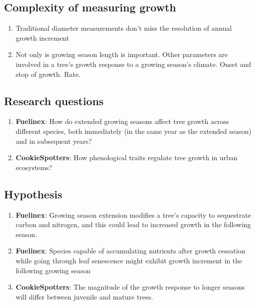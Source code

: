 \documentclass{article}
\begin{document}
\subsection{Complexity of measuring growth}
\begin{enumerate}
	\item Traditional diameter measurements don't miss the resolution of annual growth increment
	\item Not only is growing season length is important. Other parameters are involved in a tree's growth response to a growing season's climate. Onset and stop of growth. Rate. 
\end{enumerate}

\subsection {Research questions} %
\begin {enumerate}
	\item \textbf{Fuelinex}: How do extended growing seasons affect tree growth across different species, both immediately (in the same year as the extended season) and in subsequent years?
	\item \textbf {CookieSpotters}: How phenological traits regulate tree growth in urban ecosystems?
\end {enumerate}

\subsection{Hypothesis}
\begin {enumerate}
	\item \textbf{Fuelinex}: Growing season extension modifies a tree’s capacity to sequestrate carbon and nitrogen, and this could lead to increased growth in the following season.
	\item \textbf{Fuelinex}: Species capable of accumulating nutrients after growth cessation while going through leaf senescence might exhibit growth increment in the following growing season
	\item \textbf{CookieSpotters}: The magnitude of the growth response to longer seasons will differ between juvenile and mature trees.
\end {enumerate}
\end{document}
